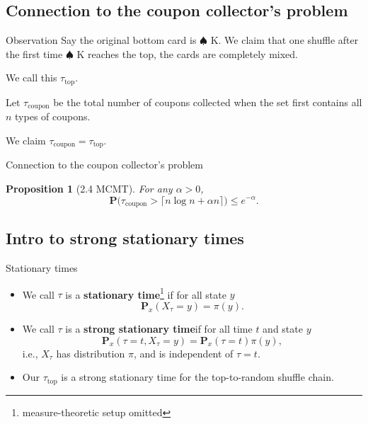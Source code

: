 \documentclass[10pt]{beamer}
\renewcommand{\Pr}{\mathbf{P}}
\newcommand{\df}[1]{\textbf{#1}} %
\newtheorem{prop}[theorem]{Proposition}
\begin{document}
\subsection{Connection to the coupon collector's problem}
\begin{frame}{Observation}
    Say the original bottom card is $\spadesuit$\!\! K. We claim that one shuffle after the first time $\spadesuit$\!\! K reaches the top, the cards are completely mixed.

    We call this $\tau_\mathrm{top}$.

    Let $\tau_\mathrm{coupon}$ be the total number of coupons collected when the set first contains all $n$ types of coupons.

    We claim $\tau_\mathrm{coupon} = \tau_\mathrm{top}$. %
\end{frame}

\begin{frame}{Connection to the coupon collector's problem}
    \begin{prop}[2.4 MCMT]
        For any $\alpha > 0$, \[\Pr\bigl(\tau_\mathrm{coupon} > \lceil n\log n + \alpha n\rceil\bigr) \leq e^{-\alpha}.\]
    \end{prop}
\end{frame}

\subsection{Intro to strong stationary times}

\begin{frame}{Stationary times}
    \begin{itemize}
        \item We call $\tau$ is a \df{stationary time}\footnote{measure-theoretic setup omitted} if for all state $y$ \[\Pr_x(X_\tau = y) = \pi(y).\]
        \item We call $\tau$ is a \df{strong stationary time}\footnotemark[\value{footnote}] if for all time $t$ and state $y$ \[\Pr_x(\tau = t, X_\tau = y) = \Pr_x(\tau  = t)\pi(y),\] i.e., $X_\tau$ has distribution $\pi$, and is independent of ${\tau = t}$.
        \item Our $\tau_\mathrm{top}$ is a strong stationary time for the top-to-random shuffle chain. %
    \end{itemize}
    
    
\end{frame}
\end{document}
